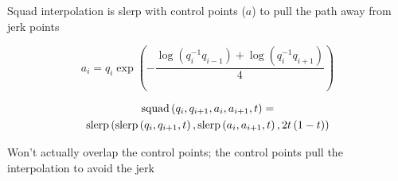   Squad interpolation is slerp with control points ($ a $) to pull the path
  away from jerk points

  \begin{equation}
    a_{i} =
      q_{i} \exp
      \left(
        - \frac{\log\left( q_{i}^{-1} q_{i - 1} \right)
        + \log\left( q_{i}^{-1} q_{i + 1} \right)}{4}
      \right)
  \end{equation}

  \begin{multline}
    \operatorname{squad}\left( q_{i}, q_{i + 1}, a_{i}, a_{i + 1}, t \right) = \\
      \operatorname{slerp}\left(
        \operatorname{slerp}\left( q_{i}, q_{i + 1}, t \right),
        \operatorname{slerp}\left( a_{i}, a_{i + 1}, t \right),
        2t \left( 1 - t \right)
      \right)
  \end{multline}

  Won’t actually overlap the control points; the control points pull the
  interpolation to avoid the jerk
